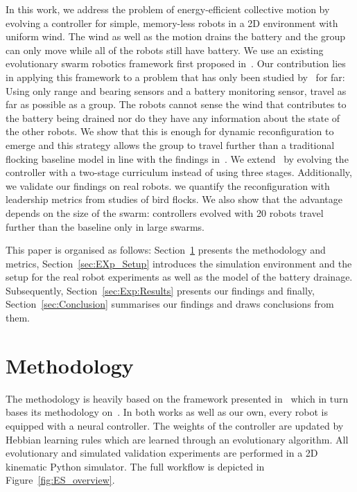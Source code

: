 \documentclass[runningheads]{llncs}
\begin{document}
In this work, we address the problem of energy-efficient collective motion by evolving a controller for simple, memory-less robots in a 2D environment with uniform wind. The wind as well as the motion drains the battery and the group can only move while all of the robots still have battery.
We use an existing evolutionary swarm robotics framework first proposed in~\cite{vandiggelen2025emergentheterogeneousswarmcontrol}. Our contribution lies in applying this framework to a problem that has only been studied by~\cite{mahdavi2026energy} for far: Using only range and bearing sensors and a battery monitoring sensor, travel as far as possible as a group. The robots cannot sense the wind that contributes to the battery being drained nor do they have any information about the state of the other robots. We show that this is enough for dynamic reconfiguration to emerge and this strategy allows the group to travel further than a traditional flocking baseline model in line with the findings in~\cite{mahdavi2026energy}. We extend~\cite{mahdavi2026energy} by evolving the controller with a two-stage curriculum instead of using three stages. Additionally, we validate our findings on real robots. we quantify the reconfiguration with leadership metrics from studies of bird flocks. We also show that the advantage depends on the size of the swarm: controllers evolved with 20 robots travel further than the baseline only in large swarms.  


This paper is organised as follows: Section~\ref{sec:methodology} presents the methodology and metrics, Section~\ref{sec:EXp_Setup} introduces the simulation environment and the setup for the real robot experiments as well as the model of the battery drainage. Subsequently, Section~\ref{sec:Exp:Results} presents our findings and finally, Section~\ref{sec:Conclusion} summarises our findings and draws conclusions from them.


\section{Methodology}
\label{sec:methodology}
The methodology is heavily based on the framework presented in~\cite{mahdavi2026energy} which in turn bases its methodology on~\cite{vandiggelen2025emergentheterogeneousswarmcontrol}. In both works as well as our own, every robot is equipped with a neural controller. The weights of the controller are updated by Hebbian learning rules which are learned through an evolutionary algorithm. All evolutionary and simulated validation experiments are performed in a 2D kinematic Python simulator.
The full workflow is depicted in Figure~\ref{fig:ES_overview}.
\end{document}
